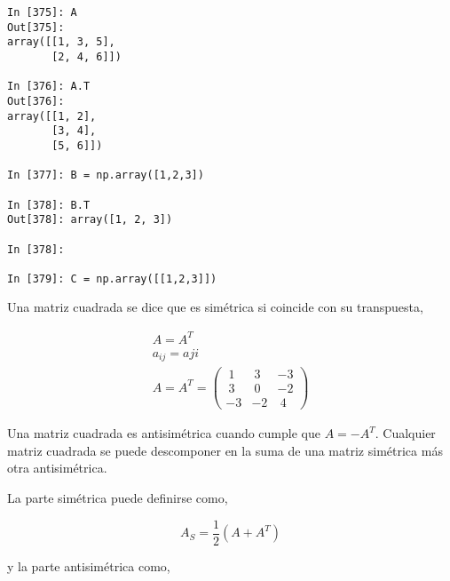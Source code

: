 \begin{center}
    \begin{minipage}{0.5\textwidth}
        \begin{verbatim}
In [375]: A
Out[375]: 
array([[1, 3, 5],
       [2, 4, 6]])

In [376]: A.T
Out[376]: 
array([[1, 2],
       [3, 4],
       [5, 6]])

In [377]: B = np.array([1,2,3]) 

In [378]: B.T
Out[378]: array([1, 2, 3])

In [378]: 

In [379]: C = np.array([[1,2,3]])
        \end{verbatim}
    \end{minipage}
\end{center}

\begin{paracol}{2}
Una matriz cuadrada se dice que es simétrica si coincide con su transpuesta,
\end{paracol}

\begin{gather*}
A=A^T\\
a_{ij}=a{ji}\\
A=A^T=
\begin{pmatrix}
\ 1&\ 3&-3\\
\ 3&\ 0&-2\\
-3&-2&\ 4
\end{pmatrix}
\end{gather*}

\begin{paracol}{2}
Una matriz cuadrada es antisimétrica cuando cumple que $A=-A^T$. Cualquier matriz cuadrada se puede descomponer en la suma de una matriz simétrica más otra antisimétrica.

La parte simétrica puede definirse como,
    
\end{paracol}
\begin{equation*}
A_S=\frac{1}{2} \left( A+A^T \right)
\end{equation*}

\begin{paracol}{2}
y la parte antisimétrica como,    
\end{paracol}

